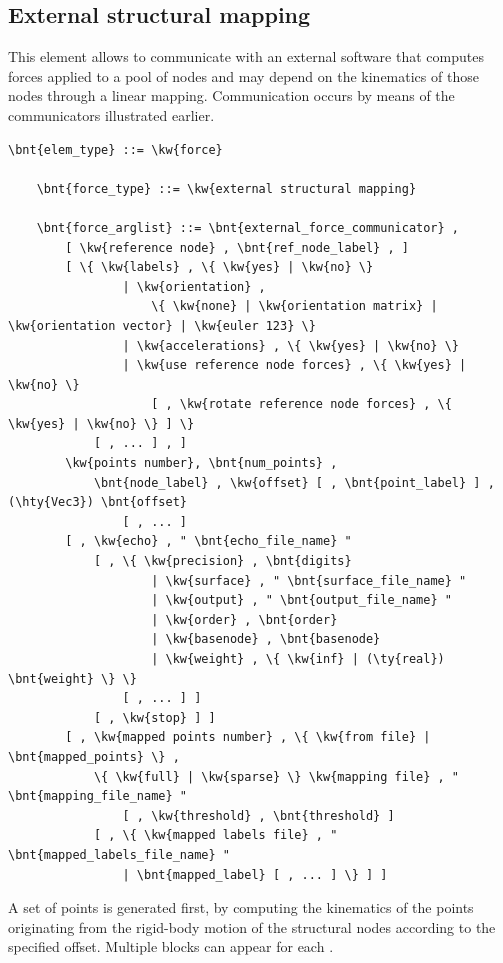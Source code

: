 \subsection{External structural mapping}
\label{sec:EL:FORCE:EXTERNAL:STRUCTURAL_MAPPING}
This element allows to communicate with an external software that computes
forces applied to a pool of nodes and may depend on the kinematics of those
nodes through a linear mapping.
Communication occurs by means of the communicators illustrated earlier.
\begin{Verbatim}[commandchars=\\\{\}]
    \bnt{elem_type} ::= \kw{force}

    \bnt{force_type} ::= \kw{external structural mapping}

    \bnt{force_arglist} ::= \bnt{external_force_communicator} ,
        [ \kw{reference node} , \bnt{ref_node_label} , ]
        [ \{ \kw{labels} , \{ \kw{yes} | \kw{no} \}
                | \kw{orientation} ,
                    \{ \kw{none} | \kw{orientation matrix} | \kw{orientation vector} | \kw{euler 123} \}
                | \kw{accelerations} , \{ \kw{yes} | \kw{no} \}
                | \kw{use reference node forces} , \{ \kw{yes} | \kw{no} \}
                    [ , \kw{rotate reference node forces} , \{ \kw{yes} | \kw{no} \} ] \}
            [ , ... ] , ]
        \kw{points number}, \bnt{num_points} ,
            \bnt{node_label} , \kw{offset} [ , \bnt{point_label} ] , (\hty{Vec3}) \bnt{offset}
                [ , ... ]
        [ , \kw{echo} , " \bnt{echo_file_name} "
            [ , \{ \kw{precision} , \bnt{digits}
                    | \kw{surface} , " \bnt{surface_file_name} "
                    | \kw{output} , " \bnt{output_file_name} "
                    | \kw{order} , \bnt{order}
                    | \kw{basenode} , \bnt{basenode}
                    | \kw{weight} , \{ \kw{inf} | (\ty{real}) \bnt{weight} \} \}
                [ , ... ] ]
            [ , \kw{stop} ] ]
        [ , \kw{mapped points number} , \{ \kw{from file} | \bnt{mapped_points} \} ,
            \{ \kw{full} | \kw{sparse} \} \kw{mapping file} , " \bnt{mapping_file_name} "
                [ , \kw{threshold} , \bnt{threshold} ]
            [ , \{ \kw{mapped labels file} , " \bnt{mapped_labels_file_name} "
                | \bnt{mapped_label} [ , ... ] \} ] ]
\end{Verbatim}
A set of  points is generated first,
by computing the kinematics of the points originating
from the rigid-body motion of the structural nodes 
according to the specified offset.
Multiple  blocks can appear for each .

